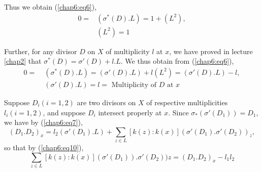 Thus we obtain (\ref{chap6:eq6}), 
\begin{align*}
  0 = & (\sigma^*(D).L) = 1 + (L^2), \tag{9}\label{chap6:eq9}\\ 
  & (L^2) = 1 
\end{align*}

Further, for any divisor $D$ on $X$ of multiplicity $l$ at $x$, we
have proved in lecture \ref{chap2} that $\sigma^*(D) = \sigma'(D) + l.L$. We
thus obtain from (\ref{chap6:eq6}), 
  \begin{align*}
    0 = \; & (\sigma^*(D).L) = (\sigma'(D).L) + l(L^2) =
    (\sigma'(D).L) -l,\\ 
    \; & (\sigma'(D).L) = l = \text{ Multiplicity of $D$ at $x$}
  \tag{10}\label{chap6:eq10}
  \end{align*}

Suppose $D_i(i = 1,2)$ are two divisors on $X$ of respective
multiplicities $l_i(i = 1,2)$, and suppose $D_i$ intersect properly at
$x$. Since $\sigma_*(\sigma'(D_1)) = D_1$, we have by (\ref{chap6:eq7}), 
$$
(D_1.D_2)_x = l_2(\sigma'(D_1).L) + \sum_{z \in L} [k(z):k(x)]
(\sigma'(D_1) . \sigma' (D_2))_z, 
$$
so that by (\ref{chap6:eq10}),
\begin{equation*}
  \sum_{z\in L}[k(z):k(x)] (\sigma'(D_1) ). \sigma'(D_2))z
  =(D_1.D_2)_x -l_1 l_2 \tag{11}\label{chap6:eq11}
\end{equation*}

